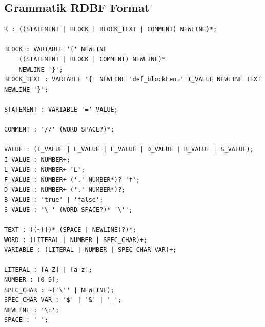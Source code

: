 \documentclass[parskip=full]{scrartcl}
\begin{document}
\subsection{Grammatik RDBF Format} \label{RDBF}
\begin{verbatim}
R : ((STATEMENT | BLOCK | BLOCK_TEXT | COMMENT) NEWLINE)*;

BLOCK : VARIABLE '{' NEWLINE
	((STATEMENT | BLOCK | COMMENT) NEWLINE)*
	NEWLINE '}';
BLOCK_TEXT : VARIABLE '{' NEWLINE 'def_blockLen=' I_VALUE NEWLINE TEXT NEWLINE '}';
	
STATEMENT : VARIABLE '=' VALUE;

COMMENT : '//' (WORD SPACE?)*;

VALUE : (I_VALUE | L_VALUE | F_VALUE | D_VALUE | B_VALUE | S_VALUE);
I_VALUE : NUMBER+;
L_VALUE : NUMBER+ 'L';
F_VALUE : NUMBER+ ('.' NUMBER*)? 'f';
D_VALUE : NUMBER+ ('.' NUMBER*)?;
B_VALUE : 'true' | 'false';
S_VALUE : '\'' (WORD SPACE?)* '\'';

TEXT : ((~[])* (SPACE | NEWLINE)?)*;
WORD : (LITERAL | NUMBER | SPEC_CHAR)+;
VARIABLE : (LITERAL | NUMBER | SPEC_CHAR_VAR)+;

LITERAL : [A-Z] | [a-z];
NUMBER : [0-9];
SPEC_CHAR : ~('\'' | NEWLINE);
SPEC_CHAR_VAR : '$' | '&' | '_';
NEWLINE : '\n';
SPACE : ' ';
\end{verbatim}
\end{document}
